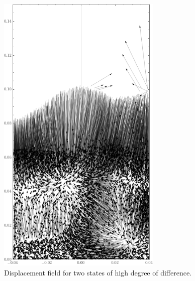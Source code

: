 \documentclass[9pt, english]{beamer}
\begin{document}
\begin{frame}[fragile]
\begin{columns}[t]
\begin{column}{0.5\textwidth}
\begin{figure}
\includegraphics[width=0.7\textwidth]{fludidized_bed_displacement_2.png}
\caption{Displacement field for two states of high degree of difference.}
\end{figure}
\end{column}
\end{columns}
\end{frame}
\end{document}
